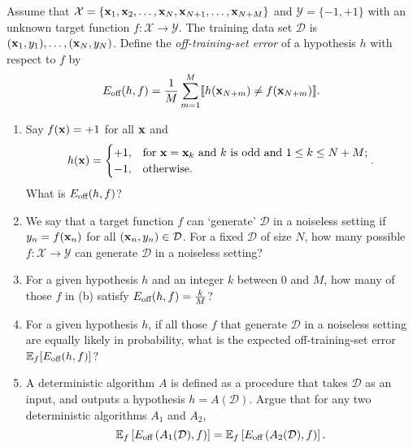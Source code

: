 \documentclass{amsart}
\begin{document}
\begin{problem}[1.10]
  Assume that \(\mathcal{X} = \{{\bf x}_1, {\bf x}_2, \ldots, {\bf x}_N,
  {\bf x}_{N+1}, \ldots, {\bf x}_{N+M}\}\) and
  \(\mathcal{Y} = \{-1, +1\}\) with an unknown target function
  \(f : \mathcal{X} \to \mathcal{Y}\). The training data set \(\mathcal{D}\)
  is \(({\bf x}_1, y_1), \ldots, ({\bf x}_N, y_N)\).
  Define the \emph{off-training-set error}
  of a hypothesis \(h\) with respect to \(f\) by
  \begin{equation*}
    E_{\textup{off}}(h, f) = \frac{1}{M} \sum_{m=1}^M
        \llbracket h({\bf x}_{N+m}) \neq f({\bf x}_{N+m}) \rrbracket.
  \end{equation*}
  \begin{enumerate}
    \item Say \(f({\bf x}) = +1\) for all \({\bf x}\) and
      \begin{equation*}
        h({\bf x}) = \begin{cases}
          +1, & \textup{for } {\bf x} = {\bf x}_k \textup{ and \(k\) is odd and}
            \textup{ } 1 \leq k \leq N + M \textup{;} \\
          -1, & \textup{otherwise.}
        \end{cases}.
      \end{equation*}
      What is \(E_{\textup{off}}(h, f)\)?
    \item We say that a target function \(f\) can `generate' \(\mathcal{D}\) in
      a noiseless setting if \(y_n = f({\bf x}_n)\) for all
      \(({\bf x}_n, y_n) \in \mathcal{D}\). For a fixed \(\mathcal{D}\) of size
      \(N\), how many possible \(f : \mathcal{X} \to \mathcal{Y}\) can generate
      \(\mathcal{D}\) in a noiseless setting?
    \item For a given hypothesis \(h\) and an integer \(k\) between 0 and \(M\),
      how many of those \(f\) in (b) satisfy
      \(E_{\textup{off}}(h, f) = \frac{k}{M}\)?
    \item For a given hypothesis \(h\), if all those \(f\) that generate
      \(\mathcal{D}\) in a noiseless setting are equally likely in probability,
      what is the expected off-training-set error
      \(\mathbb{E}_f[E_{\textup{off}}(h, f)]\)?
    \item A deterministic algorithm \(A\) is defined as a procedure that takes
      \(\mathcal{D}\) as an input, and outputs a hypothesis
      \(h = A(\mathcal{D})\). Argue that for any two deterministic algorithms
      \(A_1\) and \(A_2\),
      \begin{equation*}
        \mathbb{E}_f\left[E_{\textup{off}}\left(A_1(\mathcal{D}),
          f\right)\right]
          = \mathbb{E}_f\left[E_{\textup{off}}\left(A_2(\mathcal{D}),
          f\right)\right].
      \end{equation*}
  \end{enumerate}
\end{problem}
\end{document}
